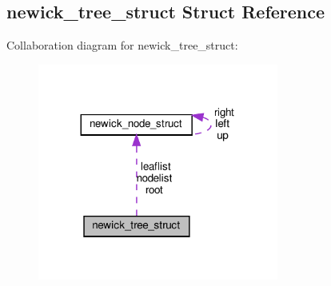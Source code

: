 \hypertarget{structnewick__tree__struct}{}\subsection{newick\+\_\+tree\+\_\+struct Struct Reference}
\label{structnewick__tree__struct}


Collaboration diagram for newick\+\_\+tree\+\_\+struct\+:\nopagebreak
\begin{figure}[H]
\begin{center}
\leavevmode
\includegraphics[width=224pt]{structnewick__tree__struct__coll__graph}
\end{center}
\end{figure}
